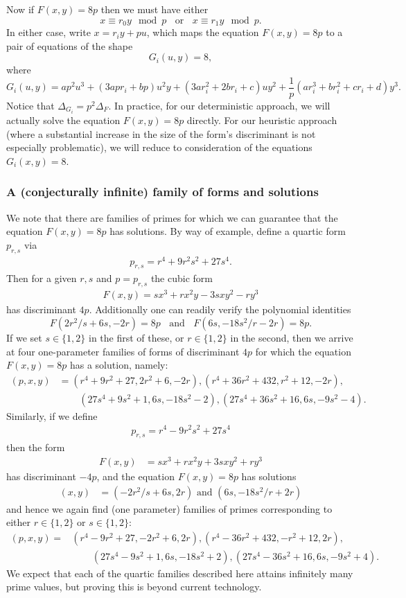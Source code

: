 Now if $F(x,y)=8p$ then we must have either
$$
 x \equiv r_0 y \mod{p} \; \; \mbox{ or } \; \; 
 x \equiv r_1 y \mod{p}.
$$
In either case, write $x=r_i y + p u$, which maps the equation $F(x,y)=8p$ to a pair of equations of the shape
$$
G_i(u,y) = 8,
$$
where
$$
G_i(u,y) = ap^2 u^3 + (3 a p r_i + bp) u^2 y + (3 a r_i^2 + 2 b r_i + c) u y^2 + \frac{1}{p} (a r_i^3 + b r_i^2 + c 
r_i + d) y^3.
$$
Notice that $\Delta_{G_i}= p^2 \Delta_F$. In practice, for our deterministic approach, we will actually solve the 
equation $F(x,y)=8p$ directly. For our heuristic approach (where a substantial increase in the size of the form's 
discriminant is not especially problematic), we will reduce to consideration of the equations 
$G_i(x,y)=8$.

\subsubsection{A (conjecturally infinite) family of forms and solutions}
We note that there are families of primes for which we can guarantee that the equation $F(x,y)=8p$ has solutions. By way of
example, define a quartic form $p_{r,s}$ via
\begin{align*}
p_{r,s}=r^4+9 r^2 s^2 + 27 s^4.
\end{align*}
Then for a given $r,s$ and $p=p_{r,s}$ the cubic form 
\begin{align*}
F(x,y) = s x^3 + r x^2 y - 3 s x y^2 -r y^3
\end{align*}
has discriminant $4 p$. Additionally one can readily verify the polynomial identities
$$
F(2r^2/s+6s,-2r) = 8p \; \; \mbox{ and } \; \;  F(6s,-18s^2/r-2r) = 8p.
$$
If we set $s \in \{ 1, 2 \}$ in the first of these, or $r \in \{ 1, 2 \}$ in the second, then we arrive at four one-parameter families 
of forms of discriminant $4p$ for which the equation $F(x,y)=8p$ has a solution, namely:
\begin{align*}
(p,x,y) &= (r^4+9r^2+27,2r^2+6,-2r), (r^4+36 r^2 + 432,r^2+12,-2r), \\
 &\phantom{=+}  (27 s^4+9 s^2+1,6s,-18s^2-2), (27s^4+36s^2+16,6s,-9s^2-4).
\end{align*}
Similarly, if we define 
\begin{align*}
p_{r,s}=r^4-9 r^2 s^2 + 27 s^4
\end{align*}
then the form
\begin{align*}
F(x,y) &= s x^3 + r x^2 y + 3 s x y^2 +r y^3
\end{align*}
has discriminant $-4 p$, and the equation $F(x,y)=8p$ has solutions
\begin{align*}
(x,y) &= (-2r^2/s + 6s, 2r)  \text{ and } (6s,-18s^2/r + 2r)
\end{align*}
and hence we again find  (one parameter) families  of primes corresponding to either $r\in \{ 1,2 \}$ or $s\in \{1,2 \}$:
\begin{align*}
(p,x,y)= & (r^4-9r^2+27,-2r^2+6,2r), (r^4-36 r^2 + 432,-r^2+12,2r), \\
 &\phantom{=+} (27 s^4-9 s^2+1,6s,-18s^2+2), (27s^4-36s^2+16,6s,-9s^2+4).
\end{align*}
We expect that each of the quartic families described here attains infinitely many prime values, but proving this is 
beyond current technology.

